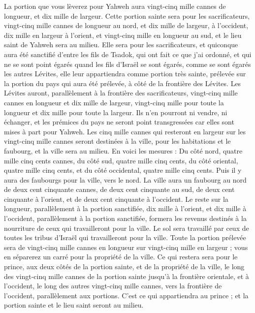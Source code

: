 \begin{multicols}{2}
La portion que vous lèverez pour Yahweh aura vingt-cinq mille cannes de longueur, et dix mille de largeur.
Cette portion sainte sera  pour les sacrificateurs, vingt-cinq mille cannes de longueur au nord, et dix mille de largeur, à l’occident, dix mille en largeur à l’orient, et vingt-cinq mille en longueur au sud, et le lieu saint de Yahweh sera au milieu.
Elle sera pour les sacrificateurs, et quiconque aura été sanctifié d'entre les fils de Tsadok, qui ont fait ce que j'ai ordonné, et qui ne se sont point égarés quand les fils d'Israël se sont égarés, comme se sont égarés les autres Lévites,
elle leur appartiendra comme portion très sainte, prélevée sur la portion du pays qui aura été prélevée, à côté de la frontière des Lévites.
Les Lévites auront, parallèlement à la frontière des sacrificateurs, vingt-cinq mille cannes en longueur et dix mille de largeur, vingt-cinq mille pour toute la longueur et dix mille pour toute la largeur.
Ils n’en pourront ni vendre, ni échanger, et les prémices du pays ne seront point transgressées car elles sont mises à part pour Yahweh.
Les cinq mille cannes qui resteront en largeur sur les vingt-cinq mille cannes seront destinées à la ville, pour les habitations et le faubourg, et la ville sera au milieu.
En voici les mesures : Du côté nord, quatre mille cinq cents cannes, du côté sud, quatre mille cinq cents, du côté oriental, quatre mille cinq cents, et du côté occidental, quatre mille cinq cents.
Puis il y aura des faubourgs pour la ville, vers le nord. La ville aura un faubourg au nord de deux cent cinquante cannes, de deux cent cinquante au sud, de deux cent cinquante à l’orient, et de deux cent cinquante à l’occident.
Le  reste sur la longueur, parallèlement à la portion sanctifiée, dix mille à l'orient, et dix mille à l’occident, parallèlement à la portion sanctifiée, formera les revenus destinés à la nourriture de ceux qui travailleront pour la ville.
Le sol sera travaillé par ceux de toutes les tribus d'Israël qui travailleront pour la ville.
Toute la portion prélevée sera de vingt-cinq mille cannes en longueur sur vingt-cinq mille en largeur ; vous en séparerez un carré pour la propriété de la ville.
Ce qui restera sera pour le prince, aux deux côtés de la portion sainte, et de la propriété de la ville, le long des vingt-cinq mille cannes de la portion sainte jusqu’à la  frontière orientale, et à l'occident, le long des autres vingt-cinq mille cannes, vers la frontière de l'occident, parallèlement aux portions. C’est ce qui appartiendra au prince ; et la portion sainte et le lieu saint seront au milieu.

\end{multicols}
